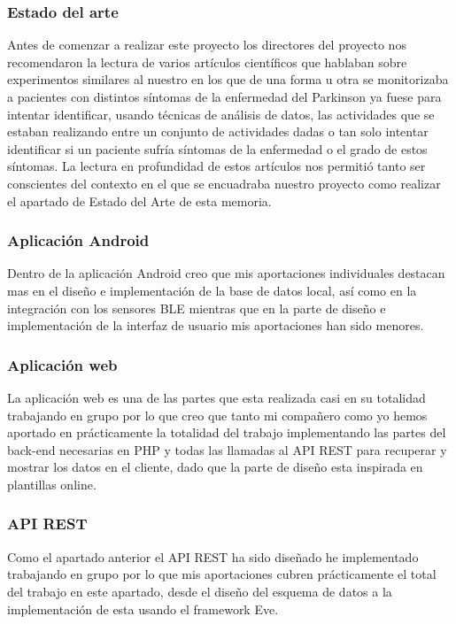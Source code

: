 \subsubsection{Estado del arte}
Antes de comenzar a realizar este proyecto los directores del proyecto nos recomendaron la lectura de varios artículos científicos que hablaban sobre experimentos similares al nuestro en los que de una forma u otra se monitorizaba a pacientes con distintos síntomas de la enfermedad del Parkinson ya fuese para intentar identificar, usando técnicas de análisis de datos, las actividades que se estaban realizando entre un conjunto de actividades dadas o tan solo intentar identificar si un paciente sufría síntomas de la enfermedad o el grado de estos síntomas. La lectura en profundidad de estos artículos nos permitió tanto ser conscientes del contexto en el que se encuadraba nuestro proyecto como realizar el apartado de Estado del Arte de esta memoria. 

\subsubsection{Aplicación Android}

Dentro de la aplicación Android creo que mis aportaciones individuales destacan mas en el diseño e implementación de la base de datos local, así como en la integración con los sensores BLE mientras que en la parte de diseño e implementación de la interfaz de usuario mis aportaciones han sido menores.

\subsubsection{Aplicación web}
La aplicación web es una de las partes que esta realizada casi en su totalidad trabajando en grupo por lo que creo que tanto mi compañero como yo hemos aportado en prácticamente la totalidad del trabajo implementando las partes del back-end necesarias en PHP y todas las llamadas al API REST para recuperar y mostrar los datos en el cliente, dado que la parte de diseño esta inspirada en plantillas online.

\subsubsection{API REST}
Como el apartado anterior el API REST ha sido diseñado he implementado trabajando en grupo por lo que mis aportaciones cubren prácticamente el total del trabajo en este apartado, desde el diseño del esquema de datos a la implementación de esta usando el framework Eve.

